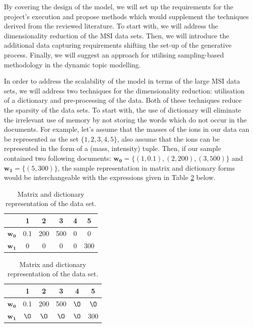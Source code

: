 \documentclass{mprop}
\begin{document}
\par By covering the design of the model, we will set up the requirements for the project's execution and propose methods which would supplement the techniques derived from the reviewed literature. To start with, we will address the dimensionality reduction of the MSI data sets. Then, we will introduce the additional data capturing requirements shifting the set-up of the generative process. Finally, we will suggest an approach for utilising sampling-based methodology in the dynamic topic modelling. 

\par In order to address the scalability of the model in terms of the large MSI data sets, we will address two techniques for the dimensionality reduction: utilisation of a dictionary and pre-processing of the data. Both of these techniques reduce the sparsity of the data sets. To start with, the use of dictionary will eliminate the irrelevant use of memory by not storing the words which do not occur in the documents. For example, let's assume that the masses of the ions in our data can be represented as the set $\{1, 2, 3, 4, 5\}$, also assume that the ions can be represented in the form of a (mass, intensity) tuple. Then, if our sample contained two following documents: $\mathbf{w_0} = \{(1, 0.1), (2, 200), (3, 500)\}$ and $\mathbf{w_1} = \{(5, 300)\}$, the sample representation in matrix and dictionary forms would be interchangeable with the expressions given in Table \ref{tab:m_and_d} below.
\begin{table}[H]
\begin{center}
\begin{tabular}{|c||c|c|c|c|c|}
\hline
&1&2&3&4&5\\
\hline
$\mathbf{w_0}$&0.1&200&500&0&0\\
$\mathbf{w_1}$&0&0&0&0&300\\
\hline
\end{tabular}
\quad
\begin{tabular}{|c||c|c|c|c|c|}
\hline
&1&2&3&4&5\\
\hline
$\mathbf{w_0}$&0.1&200&500&$\O$&$\O$\\
$\mathbf{w_1}$&$\O$&$\O$&$\O$&$\O$&300\\
\hline
\end{tabular}
\end{center}
\caption{Matrix and dictionary representation of the data set.}
\label{tab:m_and_d}
\end{table}
\end{document}
